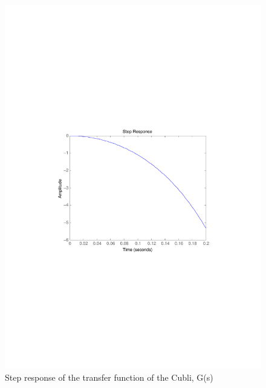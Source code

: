 \begin{figure}[H] 
	\centering 
	\includegraphics[scale=0.8]{figures/stepResponseTF}
	\centering
	\captionsetup{justification=centering}	
	\caption{Step response of the transfer function of the Cubli, G(s)}
	\label{stepCubliTF}
\end{figure}
%
